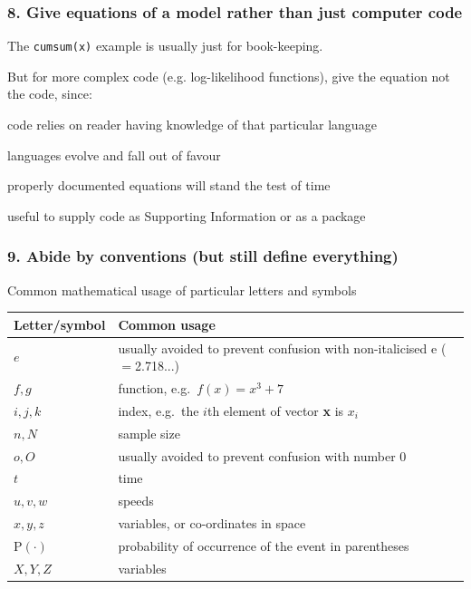 

\begin{frame}
\frametitle{8. Give equations of a model rather than just computer code}

The {\tt cumsum(x)} example is usually just for book-keeping.

\medskip

But for more complex code (e.g. log-likelihood functions), give the equation not
the code, since:
\bi
\item code relies on reader having knowledge of that particular language
\item languages evolve and fall out of favour
\item properly documented equations will stand the test of time
\item useful to supply code as Supporting Information or as a package
\ei

\end{frame}


\begin{frame}
\frametitle{9. Abide by conventions (but still define everything)}

\centering Common mathematical usage of particular letters and symbols
\begin{table}
  \centering{}
  \begin{tabular}{ll}
\hline
Letter/symbol & Common usage\\
\hline
$e$ & usually avoided to prevent confusion with non-italicised e ($=$2.718...)\\
$f, g$ & function, e.g.~$f(x) = x^3 + 7$\\
$i, j, k$ & index, e.g.~the $i$th element of vector {\bf x} is $x_i$\\
$n, N$ & sample size\\
$o, O$ & usually avoided to prevent confusion with number 0\\
$t$ & time\\
$u, v, w$ & speeds\\
$x, y, z$ & variables, or co-ordinates in space\\
\mbox{P}$(\cdot)$ & probability of occurrence of the event in parentheses\\
$X, Y, Z$ & variables\\
\hline
\end{tabular}
\end{table}

\end{frame}


